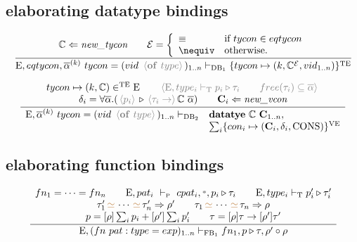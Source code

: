 \documentclass[11pt,a4paper]{article}
\newcommand{\key}[1]{\textrm{\textbf{#1}}}
\newcommand{\qualtype}[2]{#1 \triangleright #2}
\newcommand{\unifylist}[3]{#1\,{\color{brown}{\simeq}}\,\cdots\,{\color{brown}{\simeq}}\,#2 \Rightarrow #3}
\newcommand{\braced}[1]{\{#1\}}
\newcommand{\angled}[1]{\,{\color{gray}\langle#1\rangle}\,}
\newcommand{\wildcard}{{\color{gray}\scriptstyle\textbf{*}}}
\newcommand{\compose}[2]{#1 \circ #2}
\newcommand{\Type} {\textrm{T}}
\newcommand{\Env}  {\textrm{E}}
\newcommand{\VE}   {\textrm{VE}}
\newcommand{\TE}   {\textrm{TE}}
\newcommand{\DB}   {\textrm{DB}}
\newcommand{\FB}   {\textrm{FB}}
\newcommand{\VKC}  {\textrm{CONS}}
\newcommand{\tycon}{\mathbb{C}}
\newcommand{\vcon} {\mathbf{C}}
\newcommand{\equality}{\mathcal{E}}
\newcommand{\eqyes}{\equiv}
\newcommand{\eqnot}{\nequiv}
\newcommand{\vdashP}  {\ \vdash_{\textrm{\tiny P}}\  }
\newcommand{\corenew}[1]{\textit{new\_#1}}
\begin{document}
\subsection {elaborating datatype bindings}
\[
\cfrac
 {\tycon \Leftarrow \corenew{tycon} 	\qquad
  \equality = \left\{\begin{array}{ll}
  			  \eqyes	& \textrm{if } tycon \in eqtycon	\\
			  \eqnot	& \textrm{otherwise.}				\\
  			  \end{array}\right.
 }
 {\Env,eqtycon,\overline\alpha^{(k)}\ tycon = (vid\ \angled{\key{of}\ type})_{1..n} \vdash_{\DB_1} \braced{tycon \mapsto (k, \tycon^\equality,vid_{1..n})}^\TE }
\]

\[
\cfrac
 {\begin{array}{c}
  tycon \mapsto (k,\tycon) \in^\TE \Env 	                \qquad 
  \angled{\Env,type_i \vdash_\Type \qualtype{p_i}{\tau_i} 	\qquad
  free(\tau_i) \subseteq \overline{\alpha}}                 \\
  \delta_i = \forall{\overline\alpha}.
    (\qualtype{\angled{p_i}}{\angled{\tau_i \to }\tycon\ \overline\alpha}) \qquad
  \vcon_i\Leftarrow\corenew{vcon}			                \\
  \end{array} }
 {\begin{array}{ll}
  \Env,\overline\alpha^{(k)}\ tycon = (vid\ \angled{\key{of}\ type})_{1..n} \vdash_{\DB_2} 
  & \key{datatye}\ \tycon\ \vcon_{1..n}, \\
  & \sum_i\braced{con_i \mapsto (\vcon_i,\delta_i,\VKC)}^\VE \\
  \end{array}}
\]

\subsection{elaborating function bindings}
\[
\cfrac
 {\begin{array}{c}
  fn_1=\cdots=fn_n \qquad 
  \Env,pat_i  \vdashP  cpat_i,\wildcard,\qualtype{p_i}{\tau_i} \qquad
  \Env,type_i \vdash_\Type \qualtype{p_i'}{\tau_i'}            \\
  \unifylist{\tau_1'}{\tau_n'}{\rho'} \qquad
  \unifylist{\tau_1}{\tau_n}{\rho} \\
  p = [\rho]\sum_i p_i + [\rho']\sum_i p_i' \qquad
  \tau = [\rho]\tau\to[\rho']\tau'                    \\
  \end{array}}
 {\Env, (fn\ pat:type = exp)_{1..n} \vdash_{\FB_1} 
  fn_1, \qualtype{p}{\tau},\compose{\rho'}{\rho}}
\]
\end{document}
